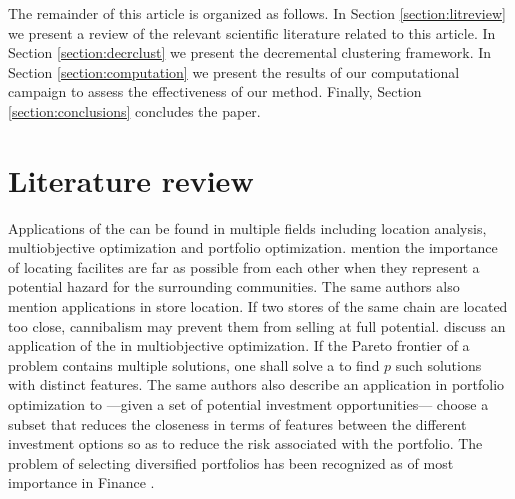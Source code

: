 \documentclass[ijoo,nonblindrev]{informs-ijoo}
\begin{document}
The remainder of this article is organized as follows. In Section \ref{section:litreview} we present a review of the relevant scientific literature related to this article. In Section \ref{section:decrclust} we present the decremental clustering framework. In Section \ref{section:computation} we present the results of our computational campaign to assess the effectiveness of our method. Finally, Section \ref{section:conclusions} concludes the paper.

\section{Literature review\label{section:litreview}}

Applications of the \pDP{} can be found in multiple fields including location analysis, multiobjective optimization and portfolio optimization. \citet{Kuby1987Programming} mention the importance of locating facilites are far as possible from each other when they represent a potential hazard for the surrounding communities. The same authors also mention applications in store location. If two stores of the same chain are located too close, cannibalism may prevent them from selling at full potential. \citet{Saboonchi2014MaxMinMin} discuss an application of the \pDP{} in multiobjective optimization. If the Pareto frontier of a problem contains multiple solutions, one shall solve a \pDP{} to find $p$ such solutions with distinct features. The same authors also describe an application in portfolio optimization to ---given a set of potential investment opportunities--- choose a subset that reduces the closeness in terms of features between the different investment options so as to reduce the risk associated with the portfolio. The problem of selecting diversified portfolios has been recognized as of most importance in Finance \citep{Statman1987how}.
\end{document}
